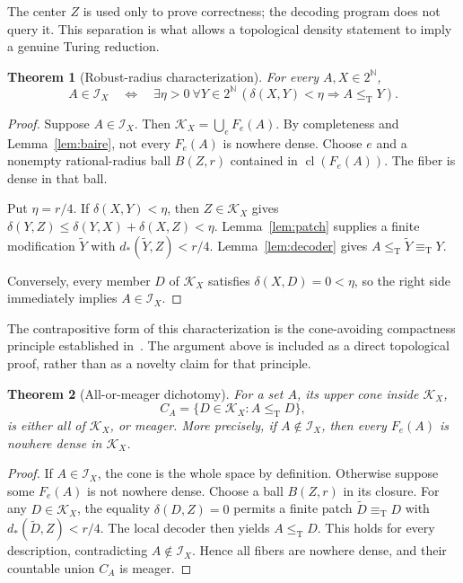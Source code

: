 \documentclass[11pt,a4paper]{article}
\newcommand{\N}{\mathbb N}
\newcommand{\Cantor}{2^{\N}}
\newcommand{\leT}{\leq_{\mathrm T}}
\newcommand{\eqT}{\equiv_{\mathrm T}}
\newcommand{\Core}{\mathcal I}
\newcommand{\dst}{d_{\!*}}
\newcommand{\cl}{\operatorname{cl}}
\newtheorem{theorem}{Theorem}[section]
\theoremstyle{definition}\newtheorem{definition}[theorem]{Definition}
\theoremstyle{remark}\newtheorem{remark}[theorem]{Remark}
\begin{document}
The center $Z$ is used only to prove correctness; the decoding program does not query it. This separation is what allows a topological density statement to imply a genuine Turing reduction.

\begin{theorem}[Robust-radius characterization]\label{thm:radius}
For every $A,X\in\Cantor$,
\begin{equation}
 A\in\Core_X\quad\Longleftrightarrow\quad
 \exists\eta>0\ \forall Y\in\Cantor\,
       (\delta(X,Y)<\eta\Longrightarrow A\leT Y).
 \label{eq:radius}
\end{equation}
\end{theorem}
\begin{proof}
Suppose $A\in\Core_X$. Then $\mathcal K_X=\bigcup_eF_e(A)$. By completeness and Lemma~\ref{lem:baire}, not every $F_e(A)$ is nowhere dense. Choose $e$ and a nonempty rational-radius ball $B(Z,r)$ contained in $\cl(F_e(A))$. The fiber is dense in that ball.

Put $\eta=r/4$. If $\delta(X,Y)<\eta$, then $Z\in\mathcal K_X$ gives $\delta(Y,Z)\le\delta(Y,X)+\delta(X,Z)<\eta$. Lemma~\ref{lem:patch} supplies a finite modification $\widetilde Y$ with $\dst(\widetilde Y,Z)<r/4$. Lemma~\ref{lem:decoder} gives $A\leT\widetilde Y\eqT Y$.

Conversely, every member $D$ of $\mathcal K_X$ satisfies $\delta(X,D)=0<\eta$, so the right side immediately implies $A\in\Core_X$.
\end{proof}

The contrapositive form of this characterization is the cone-avoiding compactness principle established in~\cite[Theorem~3.7]{HJKS}. The argument above is included as a direct topological proof, rather than as a novelty claim for that principle.

\begin{theorem}[All-or-meager dichotomy]\label{thm:dichotomy}
For a set $A$, its upper cone inside $\mathcal K_X$,
\[
                C_A=\{D\in\mathcal K_X:A\leT D\},
\]
is either all of $\mathcal K_X$, or meager. More precisely, if $A\notin\Core_X$, then every $F_e(A)$ is nowhere dense in $\mathcal K_X$.
\end{theorem}
\begin{proof}
If $A\in\Core_X$, the cone is the whole space by definition. Otherwise suppose some $F_e(A)$ is not nowhere dense. Choose a ball $B(Z,r)$ in its closure. For any $D\in\mathcal K_X$, the equality $\delta(D,Z)=0$ permits a finite patch $\widetilde D\eqT D$ with $\dst(\widetilde D,Z)<r/4$. The local decoder then yields $A\leT D$. This holds for every description, contradicting $A\notin\Core_X$. Hence all fibers are nowhere dense, and their countable union $C_A$ is meager.
\end{proof}
\end{document}
